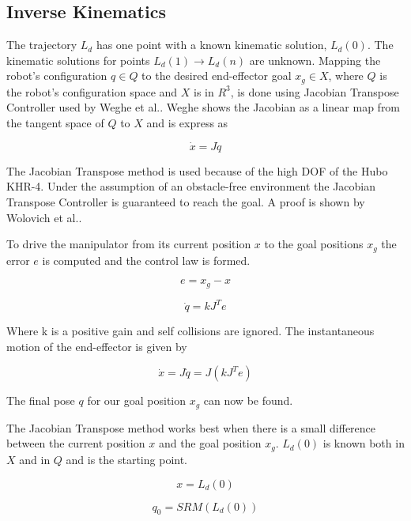\subsection{Inverse Kinematics}\label{sec:ik}
The trajectory $L_d$ has one point with a known kinematic solution, $L_d(0)$.  The kinematic solutions for points $L_d(1) \rightarrow L_d(n)$ are unknown.  Mapping the robot's configuration $q \in Q$ to the desired end-effector goal $x_g \in X$, where $Q$ is the robot's configuration space and $X$ is in $R^3$, is done using Jacobian Transpose Controller used by Weghe et al.\cite{4813913}.  Weghe shows the Jacobian as a linear map from the tangent space of $Q$ to $X$ and is express as

\begin{equation}
\dot{x} = J\dot{q}
\end{equation}

  The Jacobian Transpose method is used because of the high DOF of the Hubo KHR-4.  Under the assumption of an obstacle-free environment the Jacobian Transpose Controller is guaranteed to reach the goal.  A proof is shown by Wolovich et al.\cite{4048118}.

To drive the manipulator from its current position $x$ to the goal positions $x_g$ the error $e$ is computed and the control law is formed.

\begin{equation}
e = x_g - x
\end{equation}

\begin{equation}
\dot{q} = kJ^Te
\end{equation}

Where k is a positive gain and self collisions are ignored.  The instantaneous motion of the end-effector is given by

\begin{equation}
\dot{x} = J\dot{q} = J(kJ^Te)
\end{equation}

The final pose $q$ for our goal position $x_g$ can now be found.

The Jacobian Transpose method works best when there is a small difference between the current position $x$ and the goal position $x_g$.  $L_d(0)$ is known both in $X$ and in $Q$ and is the starting point.

\begin{equation}
x = L_d(0)
\end{equation}

\begin{equation}
q_0 = SRM  \left( L_d(0) \right)
\end{equation}

